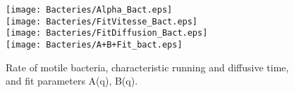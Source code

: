 \documentclass[%
 aip,
 jmp,%
 amsmath,amssymb,
reprint,%
]{revtex4-1}
\begin{document}
\begin{figure}
	\texttt{[image: Bacteries/Alpha\_Bact.eps]}\\
	\texttt{[image: Bacteries/FitVitesse\_Bact.eps]}\\
	\texttt{[image: Bacteries/FitDiffusion\_Bact.eps]}\\
	\texttt{[image: Bacteries/A+B+Fit\_bact.eps]}
	\caption{Rate of motile bacteria, characteristic running and diffusive time, and fit parameters A(q), B(q).}
	\label{FitParametersBacteria}
\end{figure}


%
%
\end{document}
